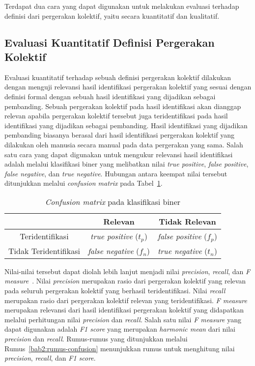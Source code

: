Terdapat dua cara yang dapat digunakan untuk melakukan evaluasi terhadap definisi dari pergerakan kolektif, yaitu secara kuantitatif dan kualitatif.

\subsection{Evaluasi Kuantitatif Definisi Pergerakan Kolektif}
\label{subsec:quantitative-theory}

Evaluasi kuantitatif terhadap sebuah definisi pergerakan kolektif dilakukan dengan menguji relevansi hasil identifikasi pergerakan kolektif yang sesuai dengan definisi formal dengan sebuah hasil identifikasi yang dijadikan sebagai pembanding. Sebuah pergerakan kolektif pada hasil identifikasi akan dianggap relevan apabila pergerakan kolektif tersebut juga teridentifikasi pada hasil identifikasi yang dijadikan sebagai pembanding. Hasil identifikasi yang dijadikan pembanding biasanya berasal dari hasil identifikasi pergerakan kolektif yang dilakukan oleh manusia  secara manual pada data pergerakan yang sama. Salah satu cara yang dapat digunakan untuk mengukur relevansi hasil identifikasi adalah melalui klasifikasi biner yang melibatkan nilai \textit{true positive}, \textit{false positive}, \textit{false negative}, dan \textit{true negative}. Hubungan antara keempat nilai tersebut ditunjukkan melalui \textit{confusion matrix} pada Tabel~\ref{bab2:confusion}.

\begin{table}[h]
    \centering
    \caption{\textit{Confusion matrix} pada klasifikasi biner}
    \begin{tabular}{|c|c|c|}
        \hline
         & Relevan & Tidak Relevan  \\ \hline
        Teridentifikasi & \textit{true positive} ($t_p$) & \textit{false positive} ($f_p$) \\ \hline
        Tidak Teridentifikasi & \textit{false negative} ($f_n$) & \textit{true negative} ($t_n$) \\
        \hline
    \end{tabular}
    \label{bab2:confusion}
\end{table}

Nilai-nilai tersebut dapat diolah lebih lanjut menjadi nilai \textit{precision}, \textit{recall}, dan \textit{F measure}~\cite{manning:02:ir}. Nilai \textit{precision} merupakan rasio dari pergerakan kolektif yang relevan pada seluruh pergerakan kolektif yang berhasil teridentifikasi. Nilai \textit{recall} merupakan rasio dari pergerakan kolektif relevan yang teridentifikasi. \textit{F measure} merupakan relevansi dari hasil identifikasi pergerakan kolektif yang didapatkan melalui perhitungan nilai \textit{precision} dan \textit{recall}. Salah satu nilai \textit{F measure} yang dapat digunakan adalah \textit{F1 score} yang merupakan \textit{harmonic mean} dari nilai \textit{precision} dan \textit{recall}. Rumus-rumus yang ditunjukkan melalui Rumus~\ref{bab2:rumus-confusion} menunjukkan rumus untuk menghitung nilai \textit{precision}, \textit{recall}, dan \textit{F1 score}.

